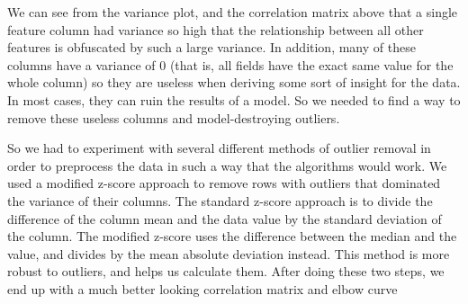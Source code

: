 \documentclass[20pt]{article} %
\begin{document}
We can see from the variance plot, and the correlation matrix above that a single feature column had variance so high that the relationship between all other features is obfuscated by such a large variance.  In addition, many of these columns have a variance of 0 (that is, all fields have the exact same value for the whole column) so they are useless when deriving some sort of insight for the data.  In most cases, they can ruin the results of a model.  So we needed to find a way to remove these useless columns and model-destroying outliers.

\newpage
So we had to experiment with several different methods of outlier removal in order to preprocess the data in such a way that the algorithms would work.  We used a modified z-score approach to remove rows with outliers that dominated the variance of their columns.  The standard z-score approach is to divide the difference of the column mean and the data value by the standard deviation of the column.  The modified z-score uses the difference between the median and the value, and divides by the mean absolute deviation instead.  This method is more robust to outliers, and helps us calculate them. After doing these two steps, we end up with a much better looking correlation matrix and elbow curve
\end{document}
